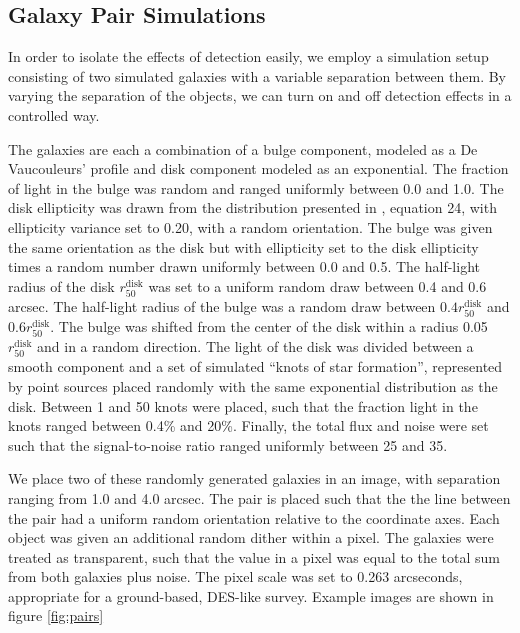 \documentclass[fleqn,useAMS,usenatbib]{mnras}
\begin{document}
\subsection{Galaxy Pair Simulations}
\label{sec:sims:pairs}

In order to isolate the effects of detection easily, we employ a simulation setup
consisting of two simulated galaxies with a variable separation between them. By
varying the separation of the objects, we can turn on and off detection effects
in a controlled way.

The galaxies are each a combination of a bulge component, modeled as a De
Vaucouleurs' profile \citep{devauc1948} and disk component modeled as an
exponential. The fraction of light in the bulge was random and ranged uniformly
between 0.0 and 1.0. The disk ellipticity was drawn from the distribution
presented in \cite{ba14}, equation 24, with ellipticity variance set to 0.20,
with a random orientation. The bulge was given the same orientation as the disk
but with ellipticity set to the disk ellipticity times a random number drawn
uniformly between 0.0 and 0.5. The half-light radius of the disk
$r_{50}^{\mathrm{disk}}$ was set to a uniform random draw between 0.4 and 0.6
arcsec. The half-light radius of the bulge was a random draw between $0.4
r_{50}^{\mathrm{disk}}$ and $0.6 r_{50}^{\mathrm{disk}}$. The bulge was shifted
from the center of the disk within a radius 0.05$r_{50}^{\mathrm{disk}}$ and in
a random direction. The light of the disk was divided between a smooth component
and a set of simulated ``knots of star formation'', represented by point sources
placed randomly with the same exponential distribution as the disk.  Between 1
and 50 knots were placed, such that the fraction light in the knots ranged
between 0.4\% and 20\%. Finally, the total flux and noise were set such that the
signal-to-noise ratio ranged uniformly between 25 and 35.

We place two of these randomly generated galaxies in an image, with separation
ranging from 1.0 and 4.0 arcsec. The pair is placed such that the the line
between the pair had a uniform random orientation relative to the coordinate
axes. Each object was given an additional random dither within a pixel. The
galaxies were treated as transparent, such that the value in a pixel was equal
to the total sum from both galaxies plus noise. The pixel scale was set to 0.263
arcseconds, appropriate for a ground-based, DES-like survey. Example images are
shown in figure \ref{fig:pairs}
\end{document}
